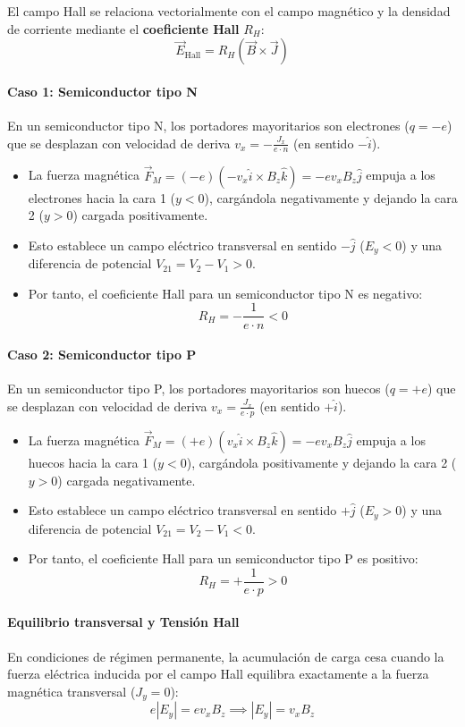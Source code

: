 El campo Hall se relaciona vectorialmente con el campo magnético y la densidad de corriente mediante el \textbf{coeficiente Hall} $R_H$:
\[
\vec{E}_{\text{Hall}} = R_H (\vec{B} \times \vec{J})
\]

\paragraph{Caso 1: Semiconductor tipo N}
En un semiconductor tipo N, los portadores mayoritarios son electrones ($q = -e$) que se desplazan con velocidad de deriva $v_x = -\frac{J_x}{e \cdot n}$ (en sentido $-\hat{i}$).
\begin{itemize}
    \item La fuerza magnética $\vec{F}_M = (-e)( -v_x \hat{i} \times B_z \hat{k} ) = -e v_x B_z \hat{j}$ empuja a los electrones hacia la cara 1 ($y < 0$), cargándola negativamente y dejando la cara 2 ($y > 0$) cargada positivamente.
    \item Esto establece un campo eléctrico transversal en sentido $-\hat{j}$ ($E_y < 0$) y una diferencia de potencial $V_{21} = V_2 - V_1 > 0$.
    \item Por tanto, el coeficiente Hall para un semiconductor tipo N es negativo:
    \[
    R_H = -\frac{1}{e \cdot n} < 0
    \]
\end{itemize}

\paragraph{Caso 2: Semiconductor tipo P}
En un semiconductor tipo P, los portadores mayoritarios son huecos ($q = +e$) que se desplazan con velocidad de deriva $v_x = \frac{J_x}{e \cdot p}$ (en sentido $+\hat{i}$).
\begin{itemize}
    \item La fuerza magnética $\vec{F}_M = (+e)( v_x \hat{i} \times B_z \hat{k} ) = -e v_x B_z \hat{j}$ empuja a los huecos hacia la cara 1 ($y < 0$), cargándola positivamente y dejando la cara 2 ($y > 0$) cargada negativamente.
    \item Esto establece un campo eléctrico transversal en sentido $+\hat{j}$ ($E_y > 0$) y una diferencia de potencial $V_{21} = V_2 - V_1 < 0$.
    \item Por tanto, el coeficiente Hall para un semiconductor tipo P es positivo:
    \[
    R_H = +\frac{1}{e \cdot p} > 0
    \]
\end{itemize}

\paragraph{Equilibrio transversal y Tensión Hall}
En condiciones de régimen permanente, la acumulación de carga cesa cuando la fuerza eléctrica inducida por el campo Hall equilibra exactamente a la fuerza magnética transversal ($J_y = 0$):
\[
e |E_y| = e v_x B_z \implies |E_y| = v_x B_z
\]

